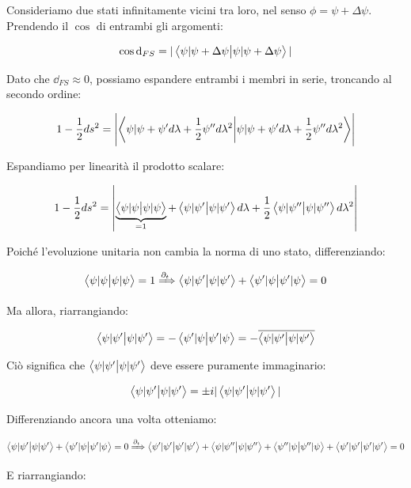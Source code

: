 \documentclass[main.tex]{subfiles}
\begin{document}
Consideriamo due stati infinitamente vicini tra loro, nel senso $\phi = \psi + \Delta\psi$. Prendendo il $\cos$ di entrambi gli argomenti:

\begin{align*}
\cos \dd_{FS} = |\braket{\psi|\psi+\Delta\psi}|
\end{align*}

Dato che $\dd_{FS}\approx 0$, possiamo espandere entrambi i membri in serie, troncando al secondo ordine:

\begin{align*}
1-\frac{1}{2} ds^2 = \left|\braket{\psi|\psi + \psi'd\lambda + \frac{1}{2}\psi'' d\lambda^2}\right|
\end{align*}

Espandiamo per linearità il prodotto scalare:

\begin{align}
1-\frac{1}{2}ds^2 = \left| \underbrace{\braket{\psi|\psi} }_{=1}+ \braket{\psi|\psi'}d\lambda + \frac{1}{2} \braket{\psi|\psi''}d\lambda^2 \right|
\label{eqn:espansione-metrica}
 \end{align}

Poiché l'evoluzione unitaria non cambia la norma di uno stato, differenziando:

\begin{align*}
\braket{\psi|\psi} = 1 \xRightarrow{\partial_t} \braket{\psi|\psi'} + \braket{\psi'|\psi} =0
\end{align*}

Ma allora, riarrangiando:

\begin{align*}
\braket{\psi|\psi'} = - \braket{\psi'|\psi} = - \overline{\braket{\psi|\psi'}}
\end{align*}

Ciò significa che $\braket{\psi|\psi'}$ deve essere puramente immaginario:

\begin{align*}
\braket{\psi|\psi'} = \pm i |\braket{\psi|\psi'}|
\end{align*}

Differenziando ancora una volta otteniamo:

\begin{align*}
 \braket{\psi|\psi'} + \braket{\psi'|\psi} =0 \xRightarrow{\partial_t} \braket{\psi'|\psi'} + \braket{\psi|\psi''} + \braket{\psi''|\psi} + \braket{\psi'|\psi'} = 0
\end{align*}

E riarrangiando:
\end{document}
